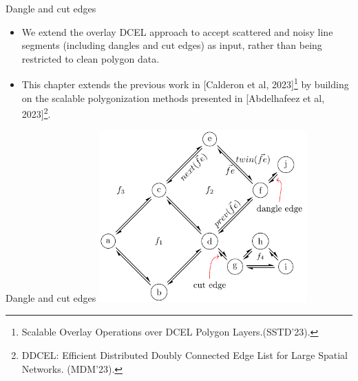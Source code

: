 \begin{frame}{Dangle and cut edges}
    \begin{itemize}
        \item We extend the overlay DCEL approach to accept scattered and noisy line segments (including dangles and cut edges) as input, rather than being restricted to clean polygon data.
        \item This chapter extends the previous work in [Calderon et al, 2023]\footnote{Scalable Overlay Operations over DCEL Polygon Layers.(SSTD'23).} by building on the scalable polygonization methods presented in [Abdelhafeez et al, 2023]\footnote{DDCEL: Efficient Distributed Doubly Connected Edge List for Large Spatial Networks. (MDM'23).}.
    \end{itemize}
\end{frame}


\begin{frame}{Dangle and cut edges}
    \centering
    \includegraphics[width=0.6\textwidth]{../thesis/chapterExtension/dcel_example2}
\end{frame}

